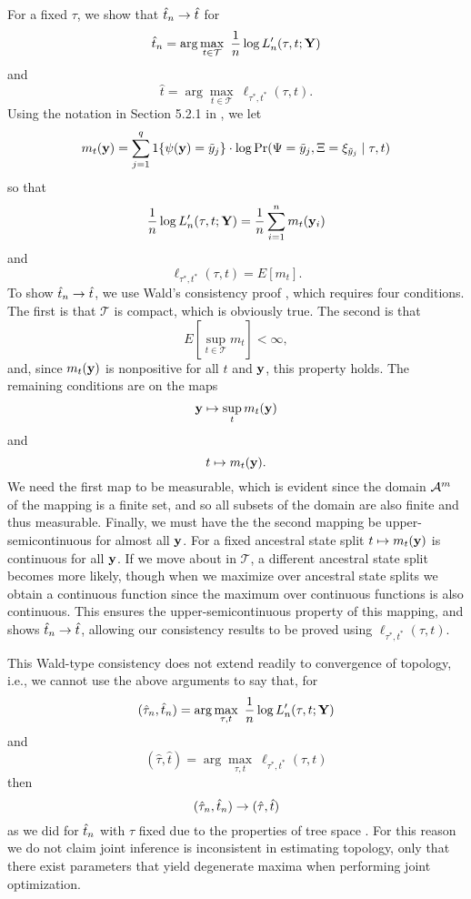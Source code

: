 For a fixed $\tau$, we show that $\hat{t}_n \rightarrow \hat{t}$ for
\[
\hat{t}_n = \arg\max_{t\in\mathcal{T}} \ \frac{1}{n}\log L_n'(\tau, t; \mathbf{Y})
\]
and
\[
\hat{t} = \arg\max_{t\in\mathcal{T}} \ \ell_{\tau^*,t^*}(\tau, t).
\]
Using the notation in Section 5.2.1 in \citet{van1998asymptotic}, we let
\[
m_t(\mathbf{y}) = \sum_{j=1}^q 1\{\psi(\mathbf{y})=\tilde{y}_j\} \cdot \log \Pr(\Psi=\tilde{y}_j, \Xi=\xi_{\tilde{y}_j} \mid \tau, t)
\]
so that
\[
\frac{1}{n}\log L_n'(\tau, t; \mathbf{Y}) = \frac{1}{n} \sum_{i=1}^n m_t(\mathbf{y}_i)
\]
and
\[
\ell_{\tau^*,t^*}(\tau, t) = E[m_t].
\]
To show $\hat{t}_n \rightarrow \hat{t}$, we use Wald's consistency proof \citep[p. 48, Theorem 5.14 of ][]{van1998asymptotic}, which requires four conditions.
The first is that $\mathcal{T}$ is compact, which is obviously true.
The second is that
\[
E\left[\sup_{t\in\mathcal{T}} m_t\right] < \infty,
\]
and, since $m_t(\mathbf{y})$ is nonpositive for all $t$ and $\mathbf{y}$, this property holds.
The remaining conditions are on the maps
\[
\mathbf{y} \mapsto \sup_t m_t(\mathbf{y})
\]
and
\[
t \mapsto m_t(\mathbf{y}).
\]
We need the first map to be measurable, which is evident since the domain $\mathcal{A}^m$ of the mapping is a finite set, and so all subsets of the domain are also finite and thus measurable.
Finally, we must have the the second mapping be upper-semicontinuous for almost all $\mathbf{y}$.
For a fixed ancestral state split $t \mapsto m_t(\mathbf{y})$ is continuous for all $\mathbf{y}$.
If we move about in $\mathcal{T}$, a different ancestral state split becomes more likely, though when we maximize over ancestral state splits we obtain a continuous function since the maximum over continuous functions is also continuous.
This ensures the upper-semicontinuous property of this mapping, and shows $\hat{t}_n \rightarrow \hat{t}$, allowing our consistency results to be proved using $\ell_{\tau^*,t^*}(\tau, t)$.

This Wald-type consistency does not extend readily to convergence of topology, i.e., we cannot use the above arguments to say that, for
\[
(\hat{\tau}_n, \hat{t}_n) = \arg\max_{\tau, t} \ \frac{1}{n}\log L_n'(\tau, t; \mathbf{Y})
\]
and
\[
(\hat{\tau}, \hat{t}) = \arg\max_{\tau, t} \ \ell_{\tau^*,t^*}(\tau, t)
\]
then
\[
(\hat{\tau}_n, \hat{t}_n) \rightarrow (\hat{\tau}, \hat{t})
\]
as we did for $\hat{t}_n$ with $\tau$ fixed due to the properties of tree space \citep{Yang1994}.
For this reason we do not claim joint inference is inconsistent in estimating topology, only that there exist parameters that yield degenerate maxima when performing joint optimization.

